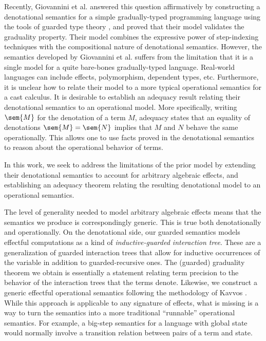 \documentclass[acmsmall, screen]{acmart}
\theoremstyle{remark}
\begin{document}
Recently, Giovannini et al. \cite{gtt-sgdt} answered this question affirmatively
by constructing a denotational semantics for a simple gradually-typed
programming language using the tools of guarded type theory \cite{first-steps},
and proved that their model validates the graduality property. Their model
combines the expressive power of step-indexing techniques with the compositional
nature of denotational semantics.
%
However, the semantics developed by Giovannini et al. suffers from the
limitation that it is a single model for a quite bare-bones gradually-typed
language. Real-world languages can include effects, polymorphism, dependent
types, etc.
%
Furthermore, it is unclear how to relate their model to a more typical
operational semantics for a cast calculus. It is desirable to establish an
adequacy result relating their denotational semantics to an operational model.
More specifically, writing $\sem{M}$ for the denotation of a term $M$, adequacy
states that an equality of denotations $\sem{M} = \sem{N}$ implies that $M$ and
$N$ behave the same operationally. This allows one to use facts proved in the
denotational semantics to reason about the operational behavior of terms.

In this work, we seek to address the limitations of the prior model by extending
their denotational semantics to account for arbitrary algebraic effects, and
establishing an adequacy theorem relating the resulting denotational model to an
operational semantics.

The level of generality needed to model arbitrary algebraic effects means that
the semantics we produce is correspondingly generic. This is true both
denotationally and operationally. On the denotational side, our guarded
semantics models effectful computations as a kind of \emph{inductive-guarded
interaction tree}. These are a generalization of guarded interaction trees
\cite{guarded-interaction-trees} that allow for inductive occurrences of the
variable in addition to guarded-recursive ones. The (guarded) graduality theorem
we obtain is essentially a statement relating term precision to the behavior of
the interaction trees that the terms denote.
%
Likewise, we construct a generic effectful operational semantics following the
methodology of Kavvos \cite{TODO}. While this approach is applicable to any
signature of effects, what is missing is a way to turn the semantics into a more
traditional ``runnable'' operational semantics. For example, a big-step
semantics for a language with global state would normally involve a transition
relation between pairs of a term and state.
\end{document}
